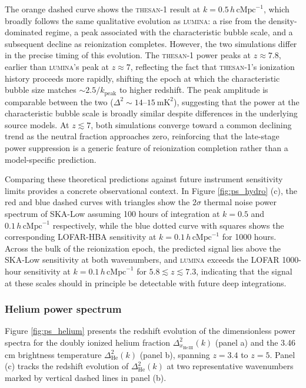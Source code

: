 \documentclass[apj,twocolumn, appendixfloats, twocolappendix, numberedappendix, tighten]{openjournal}
\DeclareRobustCommand{\lumina}{\mbox{\textsc{lumina}}\xspace}
\begin{document}
The orange dashed curve shows the \textsc{thesan-1} result at $k = 0.5\,h\,\mathrm{cMpc}^{-1}$, which broadly follows the same qualitative evolution as \lumina: a rise from the density-dominated regime, a peak associated with the characteristic bubble scale, and a subsequent decline as reionization completes. However, the two simulations differ in the precise timing of this evolution. The \textsc{thesan-1} power peaks at $z \approx 7.8$, earlier than \lumina's peak at $z \approx 7$, reflecting the fact that \textsc{thesan-1}'s ionization history proceeds more rapidly, shifting the epoch at which the characteristic bubble size matches $\sim 2.5/k_\mathrm{peak}$ to higher redshift. The peak amplitude is comparable between the two ($\Delta^2 \sim 14$--$15\ \mathrm{mK}^2$), suggesting that the power at the characteristic bubble scale is broadly similar despite differences in the underlying source models. At $z \lesssim 7$, both simulations converge toward a common declining trend as the neutral fraction approaches zero, reinforcing that the late-stage power suppression is a generic feature of reionization completion rather than a model-specific prediction.


Comparing these theoretical predictions against future instrument sensitivity limits provides a concrete observational context. In Figure \ref{fig:ps_hydro} (c), the red and blue dashed curves with triangles show the $2\sigma$ thermal noise power spectrum of SKA-Low \citep[][]{Barry2022} assuming 100 hours of integration at $k = 0.5$ and $0.1\,h\,\mathrm{cMpc}^{-1}$ respectively, while the blue dotted curve with squares shows the corresponding LOFAR-HBA \citep[][]{vanHaarlem2013} sensitivity at $k = 0.1\,h\,\mathrm{cMpc}^{-1}$ for 1000 hours. Across the bulk of the reionization epoch, the predicted signal lies above the SKA-Low sensitivity at both wavenumbers, and \lumina exceeds the LOFAR 1000-hour sensitivity at $k = 0.1\,h\,\mathrm{cMpc}^{-1}$ for $5.8 \lesssim z \lesssim 7.3$, indicating that the signal at these scales should in principle be detectable with future deep integrations.


\subsubsection{Helium power spectrum}



Figure \ref{fig:ps_helium} presents the redshift evolution of the dimensionless power spectra for the doubly ionized helium fraction $\Delta^2_{x_\mathrm{He\,III}}(k)$ (panel a) and the 3.46\,cm brightness temperature $\Delta^2_\mathrm{He}(k)$ (panel b), spanning $z = 3.4$ to $z = 5$. Panel (c) tracks the redshift evolution of $\Delta^2_\mathrm{He}(k)$ at two representative wavenumbers marked by vertical dashed lines in panel (b).
\end{document}
